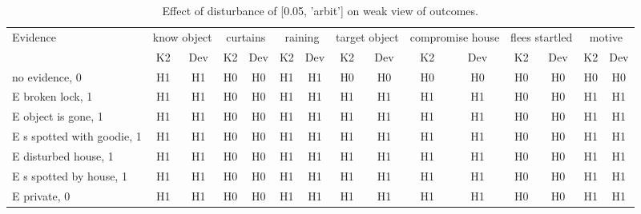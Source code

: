 \begin{table}\begin{tabular}{l|cc|cc|cc|cc|cc|cc|cc}\toprule\multirow{2}{*}{Evidence} & \multicolumn{2}{c}{know object}& \multicolumn{2}{c}{curtains}& \multicolumn{2}{c}{raining}& \multicolumn{2}{c}{target object}& \multicolumn{2}{c}{compromise house}& \multicolumn{2}{c}{flees startled}& \multicolumn{2}{c}{motive}\\& {K2} & {Dev}& {K2} & {Dev}& {K2} & {Dev}& {K2} & {Dev}& {K2} & {Dev}& {K2} & {Dev}& {K2} & {Dev}\\\midrule
no evidence, 0 & H1&H1&H0&H0&H1&H1&H0&H0&H0&H0&H0&H0&H0&H0\\E broken lock, 1 & H1&H1&H0&H0&H1&H1&H1&H1&H1&H1&H0&H0&H1&H1\\E object is gone, 1 & H1&H1&H0&H0&H1&H1&H1&H1&H1&H1&H0&H0&H1&H1\\E s spotted with goodie, 1 & H1&H1&H0&H0&H1&H1&H1&H1&H1&H1&H0&H0&H1&H1\\E disturbed house, 1 & H1&H1&H0&H0&H1&H1&H1&H1&H1&H1&H0&H0&H1&H1\\E s spotted by house, 1 & H1&H1&H0&H0&H1&H1&H1&H1&H1&H1&H0&H0&H1&H1\\E private, 0 & H1&H1&H0&H0&H1&H1&H1&H1&H1&H1&H0&H0&H1&H1\\\bottomrule\end{tabular}\caption{Effect of disturbance of [0.05, 'arbit'] on weak view of outcomes.}\end{table}